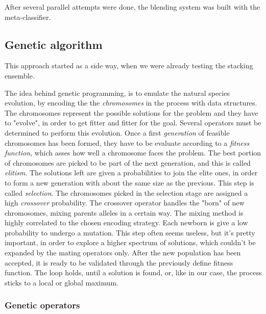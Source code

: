 After several parallel attempts were done, the blending system was built with the meta-classifier.

\subsection{Genetic algorithm}
This approach started as a side way, when we were already testing the stacking ensemble.

The idea behind genetic programming, is to emulate the natural species evolution, by encoding the the \textit{chromosomes} in the process with data structures.
The chromosomes represent the possible solutions for the problem and they have to "evolve", in order to get fitter and fitter for the goal.
Several operators must be determined to perform this evolution.
Once a first \textit{generation} of feasible chromosomes has been formed, they have to be evaluate according to a \textit{fitness function}, which asses how well a chromosome faces the problem.
The best portion of chromosomes are picked to be part of the next generation, and this is called \textit{elitism}. The solutions left are given a probabilities to join the elite ones, in order to form a new generation with about the same size as the previous. This step is called \textit{selection}.
The chromosomes picked in the selection stage are assigned a high \textit{crossover} probability.
The crossover operator handles the "born" of new chromosomes, mixing parents alleles in a certain way. The mixing method is highly correlated to the chosen encoding strategy.
Each newborn is give a low probability to undergo a mutation. This step often seems useless, but it's pretty important, in order to explore a higher spectrum of solutions, which couldn't be expanded by the mating operators only.
After the new population has been accepted, it is ready to be validated through the previously define fitness function.
The loop holds, until a solution is found, or, like in our case, the process sticks to a local or global maximum.

\subsubsection{Genetic operators}

